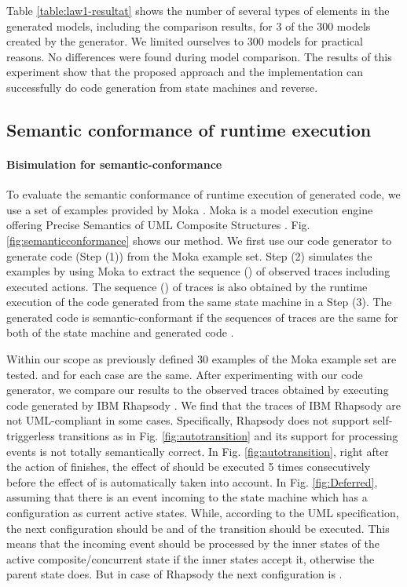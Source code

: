 Table \ref{table:law1-resultat} shows the number of several types of elements in the generated models, including the comparison results, for 3 of the 300 models created by the generator. We limited ourselves to 300 models for practical reasons. No differences were found during model comparison. The results of this experiment show that the proposed approach and the implementation can successfully do code generation from state machines and reverse. 

%

%

\subsection{Semantic conformance of runtime execution}
\paragraph{Bisimulation for semantic-conformance}
To evaluate the semantic conformance of runtime execution of generated code, we use a set of examples provided by Moka \cite{moka}. Moka is a model execution engine offering Precise Semantics of UML Composite Structures \cite{OMG2015}. Fig. \ref{fig:semanticconformance} shows our method. We first use our code generator to generate code (Step (1)) from the Moka example set. Step (2) simulates the examples by using Moka to extract the sequence () of observed traces including executed actions. The sequence () of traces is also obtained by the runtime execution of the code generated from the same state machine in a Step (3). The generated code is semantic-conformant if the sequences of traces are the same for both of the state machine and generated code \cite{Blech2005}. 

Within our scope as previously defined 30 examples of the Moka example set are tested.  and  for each case are the same. After experimenting with our code generator, we compare our results to the observed traces obtained by executing code generated by IBM Rhapsody \cite{ibm_rhapsody}. We find that the traces of IBM Rhapsody are not UML-compliant in some cases. Specifically, Rhapsody does not support self-triggerless transitions as in Fig. \ref{fig:autotransition} and its support for processing events is not totally semantically correct. In Fig. \ref{fig:autotransition}, right after the  action of  finishes, the effect of  should be executed 5 times consecutively before the effect of  is automatically taken into account. In Fig. \ref{fig:Deferred}, assuming that there is an event  incoming to the state machine which has a configuration  as current active states. While, according to the UML specification, the next configuration should be  and  of the transition  should be executed. This means that the incoming event should be processed by the inner states of the active composite/concurrent state if the inner states accept it, otherwise the parent state does. But in case of Rhapsody the next configuration is .   

